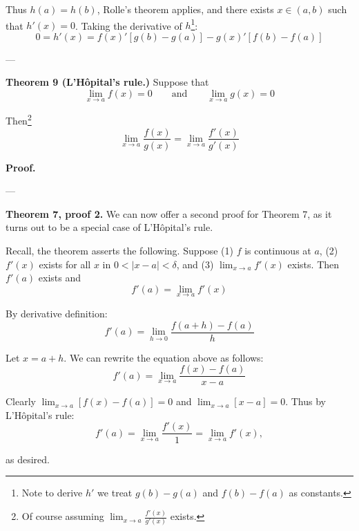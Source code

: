 Thus $h(a)=h(b)$, Rolle's theorem applies, and there exists
$x\in(a,b)$ such that $h'(x)=0$. Taking the derivative of
$h$\footnote{Note to derive $h'$ we treat $g(b)-g(a)$ and $f(b)-f(a)$
  as constants.}:
\[0=h'(x)=f(x)'[g(b)-g(a)]-g(x)'[f(b)-f(a)]\]

---\vs

\textbf{Theorem 9 (L'H\^opital's rule.)} Suppose that
\[\lim_{x\to a}f(x)=0\qquad\text{and}\qquad\lim_{x\to a}g(x)=0\]

Then\footnote{Of course assuming $\lim_{x\to a}\frac{f'(x)}{g'(x)}$ exists.}
\[\lim_{x\to a}\frac{f(x)}{g(x)}=\lim_{x\to a}\frac{f'(x)}{g'(x)}\]

\textbf{Proof.}

\vs---\vs

\textbf{Theorem 7, proof 2.} We can now offer a second proof for
Theorem 7, as it turns out to be a special case of L'H\^opital's rule.

\vs

Recall, the theorem asserts the following. Suppose (1) $f$ is
continuous at $a$, (2) $f'(x)$ exists for all $x$ in $0<|x-a|<\delta$, and
(3) $\lim_{x\to a}f'(x)$ exists. Then $f'(a)$ exists and
\[f'(a)=\lim_{x\to a}f'(x)\]

\vs

By derivative definition:
\[f'(a)=\lim_{h\to0}\frac{f(a+h)-f(a)}{h}\]

Let $x=a+h$. We can rewrite the equation above as follows:
\[f'(a)=\lim_{x\to a}\frac{f(x)-f(a)}{x-a}\]

Clearly $\lim_{x\to a}[f(x)-f(a)]=0$ and $\lim_{x\to a}[x-a]=0$. Thus by
L'H\^opital's rule:
\[f'(a)=\lim_{x\to a}\frac{f'(x)}{1}=\lim_{x\to a}f'(x),\]

as desired.

